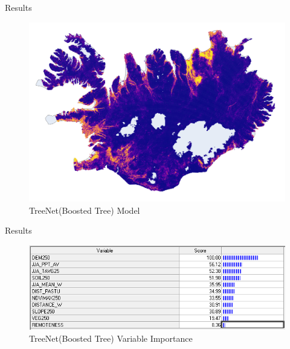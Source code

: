 \documentclass[10pt]{beamer}
\begin{document}
    \begin{frame}{Results}
        \begin{figure}
        \begin{center}
        \includegraphics[width = .9\textwidth]{figGBMrio.png}
        \caption{TreeNet(Boosted Tree) Model}
    \end{center}
    \end{figure}
    \end{frame}
    


    \begin{frame}{Results}
        \begin{figure}
        \begin{center}
        \includegraphics[width = .9\textwidth]{GradiantBoostVariableImportance.png}
        \caption{TreeNet(Boosted Tree) Variable Importance}
    \end{center}
    \end{figure}
    \end{frame}
    
\end{document}
